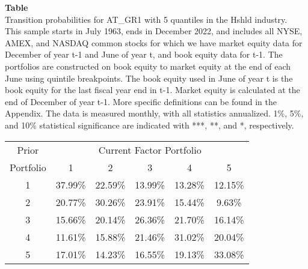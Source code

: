 \begin{table*}[ht!]
\raggedright
{}
\label{tab: transition_probs_AT_GR1_Hshld_with_5_quantiles}
\textbf{Table \thetable} \\
Transition probabilities for AT_GR1 with 5 quantiles in the Hshld industry. \\
\hspace*{1em}This sample starts in July 1963, ends in December 2022, and includes all NYSE, AMEX, and NASDAQ common stocks for which we have market equity data for December of year t-1 and June of year t, and book equity data for t-1. The portfolios are constructed on book equity to market equity at the end of each June using quintile breakpoints.  The book equity used in June of year t is the book equity for the last fiscal year end in t-1.  Market equity is calculated at the end of December of year t-1.  More specific definitions can be found in the Appendix.  The data is measured monthly, with all statistics annualized.  1\%, 5\%, and 10\% statistical significance are indicated with ***, **, and *, respectively. \\
\vspace{0.5em}
\centering
\begin{adjustbox}{max width=\textwidth}
\begin{tabular}{@{}cccccc@{}}
\toprule
Prior & \multicolumn{5}{c}{Current Factor Portfolio} \\
Portfolio & 1 & 2 & 3 & 4 & 5 \\
\midrule
1 & 37.99\% & 22.59\% & 13.99\% & 13.28\% & 12.15\% \\
2 & 20.77\% & 30.26\% & 23.91\% & 15.44\% & 9.63\% \\
3 & 15.66\% & 20.14\% & 26.36\% & 21.70\% & 16.14\% \\
4 & 11.61\% & 15.88\% & 21.46\% & 31.02\% & 20.04\% \\
5 & 17.01\% & 14.23\% & 16.55\% & 19.13\% & 33.08\% \\
\bottomrule
\end{tabular}
\end{adjustbox}
\end{table*}